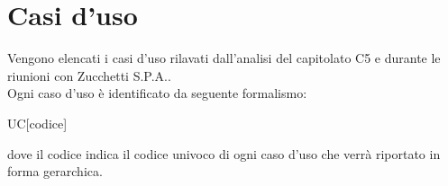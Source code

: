 \section{Casi d'uso}
Vengono elencati i casi d'uso rilavati dall'analisi del capitolato C5 e durante le riunioni con Zucchetti S.P.A.. \\
Ogni caso d'uso è identificato da seguente formalismo:
\begin{center}
	UC[codice]
\end{center}
dove il codice indica il codice univoco di ogni caso d'uso che verrà riportato in forma gerarchica.

































